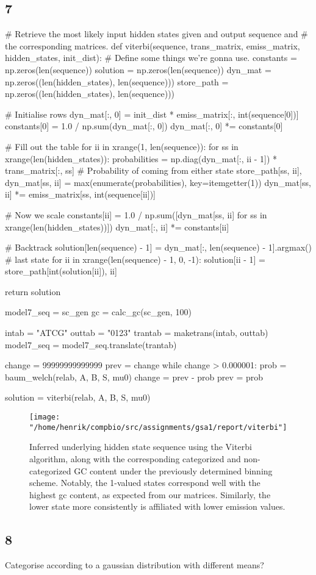 \documentclass[10pt]{article}\usepackage[]{graphicx}\usepackage[]{color}
\theoremstyle{plain}
\begin{document}
\subsection*{7}
\begin{Schunk}
\begin{Sinput}
# Retrieve the most likely input hidden states given and output sequence and
# the corresponding matrices. 
def viterbi(sequence, trans_matrix, emiss_matrix, hidden_states, init_dist):
    # Define some things we're gonna use.
    constants = np.zeros(len(sequence))
    solution = np.zeros(len(sequence))
    dyn_mat = np.zeros((len(hidden_states), len(sequence)))
    store_path = np.zeros((len(hidden_states), len(sequence)))

    # Initialise rows
    dyn_mat[:, 0] = init_dist * emiss_matrix[:, int(sequence[0])]
    constants[0] = 1.0 / np.sum(dyn_mat[:, 0])
    dyn_mat[:, 0] *= constants[0]

    # Fill out the table
    for ii in xrange(1, len(sequence)):
        for ss in xrange(len(hidden_states)):
            probabilities = np.diag(dyn_mat[:, ii - 1]) * trans_matrix[:, ss]  # Probability of coming from either state
            store_path[ss, ii], dyn_mat[ss, ii] = max(enumerate(probabilities), key=itemgetter(1))
            dyn_mat[ss, ii] *= emiss_matrix[ss, int(sequence[ii])]

        # Now we scale
        constants[ii] = 1.0 / np.sum([dyn_mat[ss, ii] for ss in xrange(len(hidden_states))])
        dyn_mat[:, ii] *= constants[ii]

    # Backtrack
    solution[len(sequence) - 1] = dyn_mat[:, len(sequence) - 1].argmax()  # last state
    for ii in xrange(len(sequence) - 1, 0, -1):
        solution[ii - 1] = store_path[int(solution[ii]), ii]

    return solution


model7_seq = sc_gen
gc = calc_gc(sc_gen, 100)

intab = "ATCG"
outtab = "0123"
trantab = maketrans(intab, outtab)
model7_seq = model7_seq.translate(trantab)

change = 99999999999999
prev = change
while change > 0.000001:
    prob = baum_welch(relab, A, B, S, mu0)
    change = prev - prob
    prev = prob

solution = viterbi(relab, A, B, S, mu0)
\end{Sinput}
\end{Schunk}
\begin{figure}[H]
  \centering
  \texttt{[image: "/home/henrik/compbio/src/assignments/gsa1/report/viterbi"]}
  \caption{Inferred underlying hidden state sequence using the Viterbi algorithm, along with the corresponding categorized and non-categorized GC content under the previously determined binning scheme. Notably, the 1-valued states correspond well with the highest gc content, as expected from our matrices. Similarly, the lower state more consistently is affiliated with lower emission values.}
  \label{fig:hidden_emit}
\end{figure}

\subsection*{8}
Categorise according to a gaussian distribution with different means? 
\end{document}
